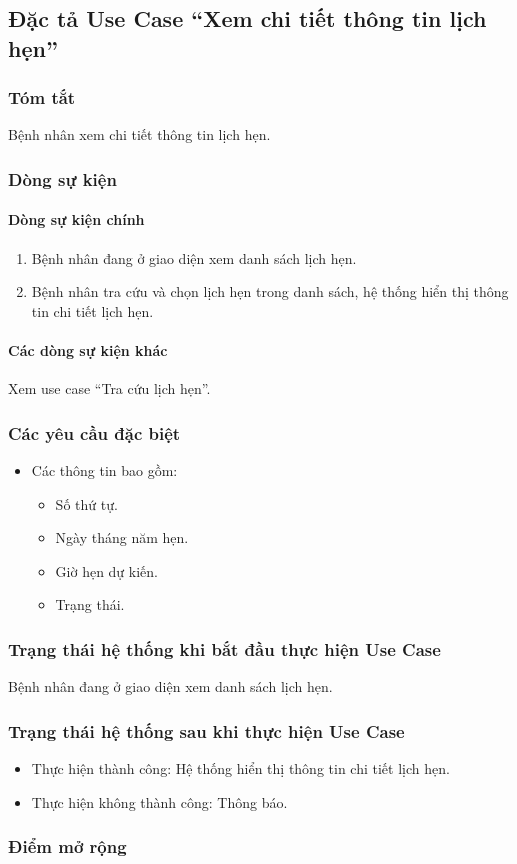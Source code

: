 \subsection{Đặc tả Use Case ``Xem chi tiết thông tin lịch hẹn''}

\subsubsection{Tóm tắt}
Bệnh nhân xem chi tiết thông tin lịch hẹn.

\subsubsection{Dòng sự kiện}
\paragraph{\textbf{Dòng sự kiện chính}}
\begin{enumerate}
  \item Bệnh nhân đang ở giao diện xem danh sách lịch hẹn.
  \item Bệnh nhân tra cứu và chọn lịch hẹn trong danh sách, hệ thống hiển thị thông tin chi tiết lịch hẹn.
\end{enumerate}

\paragraph{\textbf{Các dòng sự kiện khác}}
Xem use case ``Tra cứu lịch hẹn''.

\subsubsection{Các yêu cầu đặc biệt}
\begin{itemize}
  \item Các thông tin bao gồm:
    \begin{itemize}
      \item Số thứ tự.
      \item Ngày tháng năm hẹn.
      \item Giờ hẹn dự kiến.
      \item Trạng thái.
    \end{itemize}
\end{itemize}

\subsubsection{Trạng thái hệ thống khi bắt đầu thực hiện Use Case}
Bệnh nhân đang ở giao diện xem danh sách lịch hẹn.

\subsubsection{Trạng thái hệ thống sau khi thực hiện Use Case}
\begin{itemize}
  \item Thực hiện thành công: Hệ thống hiển thị thông tin chi tiết lịch hẹn.
  \item Thực hiện không thành công: Thông báo.
\end{itemize}

\subsubsection{Điểm mở rộng}